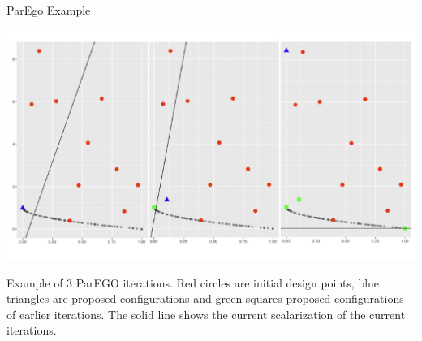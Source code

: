 \begin{frame}{ParEgo Example}

    \begin{center}
        \includegraphics[scale=0.4]{images/parego_ex}
    \end{center}
    \vspace{-0.5cm}
    \begin{scriptsize}
    Example of 3 ParEGO iterations. Red circles are initial design points, blue triangles are proposed configurations and green squares proposed configurations of earlier iterations.
    The solid line shows the current scalarization of the current iterations.
    \end{scriptsize}
\end{frame}


